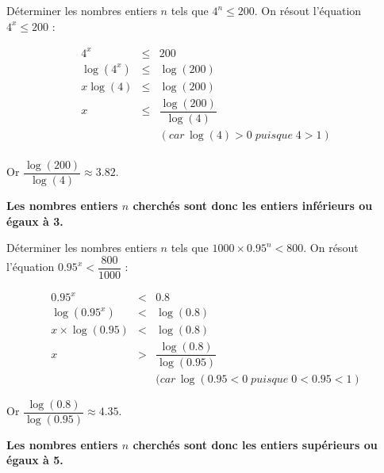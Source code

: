 \documentclass[12pt,a4paper]{article}
\begin{document}
\begin{myex}
	Déterminer les nombres entiers $n$ tels que $4^n \leq 200$. On résout l'équation $4^x \leq 200$ :
	
	
	\begin{eqnarray*}
		4^x &\leq& 200 \\
		\log (4^x) &\leq& \log (200) \\
		x \log (4) &\leq& \log (200) \\
		x &\leq& \dfrac{\log (200)}{\log (4)}  \\
		& & (car \, \log (4) > 0 \; puisque \; 4 > 1) \\
	\end{eqnarray*}

Or $\dfrac{\log (200)}{\log (4)} \approx \num{3.82}$.

\textbf{Les nombres entiers $n$ cherchés sont donc les entiers inférieurs ou égaux à 3.}
\end{myex}

\begin{myex}
	Déterminer les nombres entiers $n$ tels que $1000  \times \num{0.95}^n < 800$. On résout l'équation $\num{0.95}^x < \dfrac{800}{1000}$ :
	
	
	\begin{eqnarray*}
		\num{0.95}^x &<& \num{0.8} \\
		\log (\num{0.95}^x) &<& \log (\num{0.8}) \\
		x \times \log (\num{0.95}) &<& \log (\num{0.8}) \\
		x &>& \dfrac{\log (\num{0.8})}{\log (\num{0.95})} \\
		& & (car \, \log (\num{0.95} < 0 \; puisque \; 0 < \num{0.95} < 1) 		
	\end{eqnarray*}
	
	Or $\dfrac{\log (\num{0.8})}{\log (\num{0.95})} \approx \num{4.35}$.
	
	\textbf{Les nombres entiers $n$ cherchés sont donc les entiers supérieurs ou égaux à 5.}
\end{myex}
\end{document}
